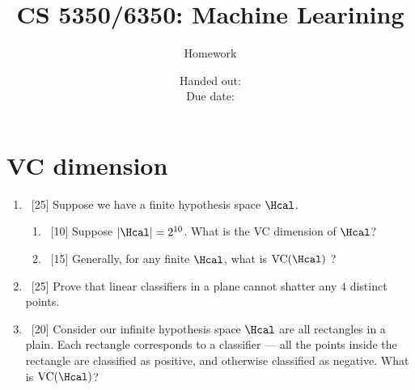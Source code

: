 \documentclass[12pt, fullpage,letterpaper]{article}
\title{CS 5350/6350: Machine Learining \semester}
\author{Homework \assignmentId}
\date{Handed out: \releaseDate\\
  Due date: \dueDate}
\begin{document}
\maketitle





\section{VC dimension}
\begin{enumerate}
\item~[25] Suppose we have a finite hypothesis space $\Hcal$.
\begin{enumerate}
\item~[10] Suppose $|\Hcal| = 2^{10}$. What is the VC dimension of $\Hcal$? 
\item~[15] Generally, for  any finite $\Hcal$, what is $\mathrm{VC}(\Hcal)$ ?
\end{enumerate}
\item~[25] Prove that linear classifiers in a plane cannot shatter any $4$ distinct points. 
\item~[20] Consider our infinite hypothesis space $\Hcal$ are all rectangles in a plain. Each rectangle corresponds to a classifier --- all the points inside the rectangle are classified as positive, and otherwise classified as negative. What is $\mathrm{VC}(\Hcal)$? 
\end{enumerate}
\end{document}

